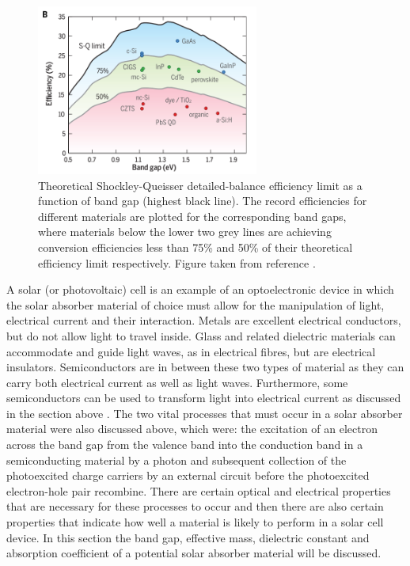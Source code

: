 \begin{figure}[h!]
  \centering
    \includegraphics[width=0.65\textwidth]{figures/SQ_new.png}
    \caption{Theoretical Shockley-Queisser detailed-balance efficiency limit as a function of band gap\cite{SQ_1961} (highest black line). The record efficiencies for different materials are plotted for the corresponding band gaps, where materials below the lower two grey lines are achieving conversion efficiencies less than 75\% and 50\% of their theoretical efficiency limit respectively. Figure taken from reference .}
  \label{SQ}
\end{figure}

A solar (or photovoltaic) cell is an example of an optoelectronic device in which the solar absorber material of choice must allow for the manipulation of light, electrical current and their interaction. Metals are excellent electrical conductors, but do not allow light to travel inside. Glass and related dielectric materials can accommodate and guide light waves, as in electrical fibres, but are electrical insulators. Semiconductors are in between these two types of material as they can carry both electrical current as well as light waves. Furthermore, some semiconductors can be used to transform light into electrical current as discussed in the section above \cite{mat_prop1}. The two vital processes that must occur in a solar absorber material were also discussed above, which were: the excitation of an electron across the band gap from the valence band into the conduction band in a semiconducting material by a photon and subsequent collection of the photoexcited charge carriers by an external circuit before the photoexcited electron-hole pair recombine. There are certain optical and electrical properties that are necessary for these processes to occur and then there are also certain properties that indicate how well a material is likely to perform in a solar cell device. In this section the band gap, effective mass, dielectric constant and absorption coefficient of a potential solar absorber material will be discussed.

